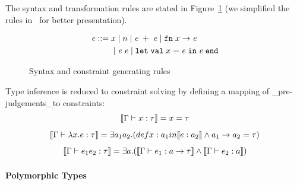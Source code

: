 The syntax and transformation rules are stated in
Figure~\ref{figure:ml-constraints} (we simplified the rules
in~\cite{haack:slicing} for better presentation).

\begin{figure}
\hfil
\begin{minipage}{2.3in}
\begin{align*}
\mathit{e} ::=\; & x \mid n \mid \mathit{e}\; + \; \mathit{e} \mid \mathtt{fn}\; x \rightarrow \mathit{e} \\
        & \mid \mathit{e}\; \mathit{e} \mid \mathtt{let}\; \mathtt{val}\; x = \mathit{e}\; \mathtt{in}\; \mathit{e}\; \mathtt{end}
\end{align*}

\end{minipage}
\hfil
\caption{Syntax and constraint generating rules}
\label{figure:ml-constraints}
\end{figure}


Type inference is reduced to constraint solving by defining a mapping
of _pre-judgements_to constraints:
\[\llbracket \Gamma \vdash x:\tau \rrbracket = x =\tau\]
\[\llbracket \Gamma \vdash \lambda x.e:\tau \rrbracket = \exists a_1 a_2.
(def x: a_1 in \llbracket e:a_2 \rrbracket \land a_1 \rightarrow a_2 =\tau)\]
\[\llbracket \Gamma\vdash e_1 e_2 : \tau \rrbracket = \exists a.(\llbracket \Gamma \vdash
e_1:a\rightarrow \tau \rrbracket\land \llbracket \Gamma\vdash e_2:a \rrbracket)\]


\paragraph{Polymorphic Types}

